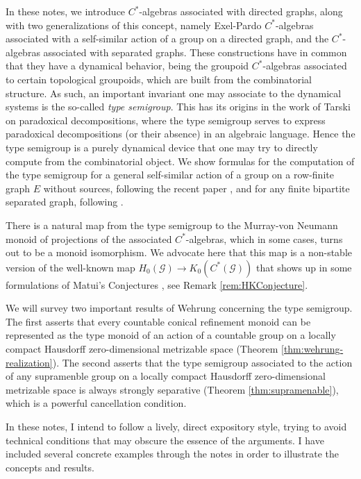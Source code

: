 \documentclass[11pt]{amsart}
\theoremstyle{plain}            %
\theoremstyle{definition}       %
\theoremstyle{definition}       %
\theoremstyle{remark}
\begin{document}
In these notes, we introduce $C^*$-algebras associated with directed graphs, along with two generalizations of this concept, namely Exel-Pardo $C^*$-algebras associated with a self-similar action of a group on a directed graph, and the $C^*$-algebras associated with separated graphs. These constructions have in common that they have a dynamical behavior, being the groupoid $C^*$-algebras associated to certain topological groupoids, which are built from the combinatorial structure. As such, an important invariant one may associate to the dynamical systems is the so-called {\it type semigroup}. This has its origins in the work of Tarski \cite{tarski38, TomWagon} on paradoxical decompositions, where the type semigroup serves to express paradoxical decompositions (or their absence) in an algebraic language.
Hence the type semigroup is a purely dynamical device that one may try to directly compute from the combinatorial object. We show formulas for the computation of the type semigroup for a general 
self-similar action of a group on a row-finite graph $E$ without sources, following the recent paper \cite{KMP25}, and for any finite bipartite separated graph, following \cite{ae14}. 

There is a natural map from the type semigroup to the Murray-von Neumann monoid of projections of the associated $C^*$-algebras, which in some cases, turns out to be a monoid isomorphism. 
We advocate here that this map is a non-stable version of the well-known map $H_0(\mathcal G) \to K_0 (C^*(\mathcal G))$ that shows up in some formulations of Matui's Conjectures \cite{matui, BDGW}, see Remark \ref{rem:HKConjecture}.


We will survey two important results of Wehrung \cite{weh} concerning the type semigroup. The first asserts that every countable conical refinement monoid can be represented as the type monoid of an 
action of a countable group on a locally compact Hausdorff zero-dimensional metrizable space (Theorem \ref{thm:wehrung-realization}). The second asserts that the type semigroup associated to the action of any supramenble group on a locally compact Hausdorff zero-dimensional metrizable space is always strongly separative (Theorem \ref{thm:supramenable}), which is a powerful cancellation condition. 


In these notes, I intend to follow a lively, direct expository style, trying to avoid technical conditions that may obscure the essence of the arguments. 
I have included several concrete examples through the notes in order to illustrate the concepts and results. 
\end{document}
